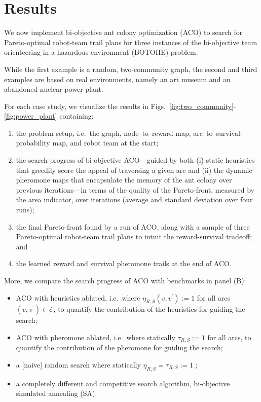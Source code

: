 \documentclass[fleqn,10pt,lineno]{wlpeerj}
\begin{document}
\section{Results}
We now implement bi-objective ant colony optimization (ACO) to search for Pareto-optimal robot-team trail plans for three instances of the bi-objective team orienteering in a hazardous environment (BOTOHE) problem.

While the first example is a random, two-community graph, the second and third examples are based on real environments, namely an art museum and an abandoned nuclear power plant.

For each case study, we visualize the results in Figs.~\ref{fig:two_community}-\ref{fig:power_plant} containing:
\begin{enumerate}[noitemsep, label=(\Alph*)]
\item the problem setup, i.e.\ the graph, node--to--reward map, arc--to--survival-probability map, and robot team at the start;
\item the search progress of bi-objective ACO---guided by both (i) static heuristics that greedily score the appeal of traversing a given arc and (ii) the dynamic pheromone maps that encapsulate the memory of the ant colony over previous iterations---in terms of the quality of the Pareto-front, measured by the area indicator, over iterations (average and standard deviation over four runs);
\item the final Pareto-front found by a run of ACO, along with a sample of three Pareto-optimal robot-team trail plans to intuit the reward-survival tradeoff; and
\item the learned reward and survival pheromone trails at the end of ACO.
\end{enumerate}
More, we compare the search progress of ACO with benchmarks in panel (B): 
\begin{itemize}[noitemsep]
\item ACO with heuristics ablated, i.e.\ where $\eta_{R, S}(v, v^\prime):=1$ for all arcs $(v, v^\prime)\in\mathcal{E}$, to quantify the contribution of the heuristics for guiding the search;
\item ACO with pheromone ablated, i.e.\ where statically $\tau_{R, S}:=1$ for all arcs, to quantify the contribution of the pheromone for guiding the search;
\item a [naive] random search where statically $\eta_{R, S}=\tau_{R,S}:=1$ ;
\item a completely different and competitive search algorithm, bi-objective simulated annealing (SA).
\end{itemize}
\end{document}
